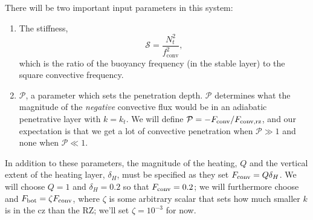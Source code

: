 \documentclass[12pt,preprint]{article}
\begin{document}
There will be two important input parameters in this system:
\begin{enumerate}
\item The stiffness, 
\begin{equation}
\mathcal{S} = \frac{N_{t}^2}{f_{\mathrm{conv}}^2},
\end{equation}
which is the ratio of the buoyancy frequency (in the stable layer) to the square convective frequency.
\item $\mathcal{P}$, a parameter which sets the penetration depth.
$\mathcal{P}$ determines what the magnitude of the \emph{negative} convective flux would be in an adiabatic penetrative layer with $k = k_t$.
We will define $\mathcal{P} = -F_{\rm{conv}}/F_{\rm{conv, rz}}$, and our expectation is that we get a lot of convective penetration when $\mathcal{P} \gg 1$ and none when $\mathcal{P} \ll 1$.
\end{enumerate}
In addition to these parameters, the magnitude of the heating, $Q$ and the vertical extent of the heating layer, $\delta_H$, must be specified as they set $F_{\rm{conv}} = Q \delta_H$.
We will choose $Q = 1$ and $\delta_H = 0.2$ so that $F_{\rm{conv}} = 0.2$; we will furthermore choose and $F_{\rm{bot}} = \zeta F_{\rm{conv}}$, where $\zeta$ is some arbitrary scalar that sets how much smaller $k$ is in the cz than the RZ; we'll set $\zeta = 10^{-3}$ for now.
\end{document}
